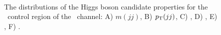 \begin{figure}[htbp]
{  }
  \mbox{
  }
  \caption[Higgs Candidate Distributions for the \ZnnH\ \qrkt\qrktbar\ Control Region]{The distributions of the Higgs boson candidate properties for the \qrkt\qrktbar\ control region of the \ZnnH\ channel: A) $m(jj)$, B) $p_{\mathrm{T}}(jj)$, C) \btagmax, D) \btagmin, E) \pTjmax, F)  \pTjmin.}
  \label{fig:CR_Znn_TT_1}
\end{figure}


 
 
 
